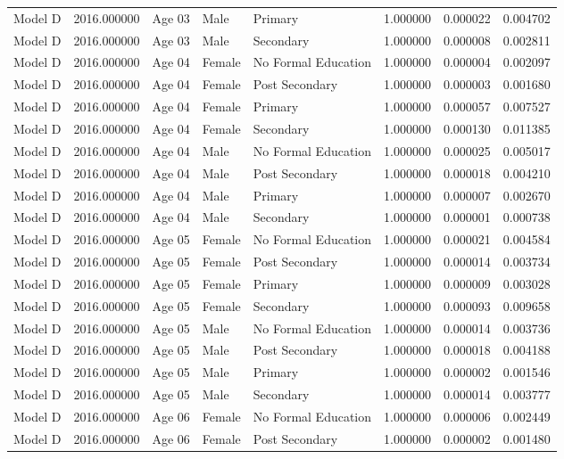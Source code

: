 \begin{table}[ht]
\begin{tabular}{lrlllrrr}
Model D & 2016.000000 & Age 03 & Male & Primary & 1.000000 & 0.000022 & 0.004702 \\
Model D & 2016.000000 & Age 03 & Male & Secondary & 1.000000 & 0.000008 & 0.002811 \\
Model D & 2016.000000 & Age 04 & Female & No Formal Education & 1.000000 & 0.000004 & 0.002097 \\
Model D & 2016.000000 & Age 04 & Female & Post Secondary & 1.000000 & 0.000003 & 0.001680 \\
Model D & 2016.000000 & Age 04 & Female & Primary & 1.000000 & 0.000057 & 0.007527 \\
Model D & 2016.000000 & Age 04 & Female & Secondary & 1.000000 & 0.000130 & 0.011385 \\
Model D & 2016.000000 & Age 04 & Male & No Formal Education & 1.000000 & 0.000025 & 0.005017 \\
Model D & 2016.000000 & Age 04 & Male & Post Secondary & 1.000000 & 0.000018 & 0.004210 \\
Model D & 2016.000000 & Age 04 & Male & Primary & 1.000000 & 0.000007 & 0.002670 \\
Model D & 2016.000000 & Age 04 & Male & Secondary & 1.000000 & 0.000001 & 0.000738 \\
Model D & 2016.000000 & Age 05 & Female & No Formal Education & 1.000000 & 0.000021 & 0.004584 \\
Model D & 2016.000000 & Age 05 & Female & Post Secondary & 1.000000 & 0.000014 & 0.003734 \\
Model D & 2016.000000 & Age 05 & Female & Primary & 1.000000 & 0.000009 & 0.003028 \\
Model D & 2016.000000 & Age 05 & Female & Secondary & 1.000000 & 0.000093 & 0.009658 \\
Model D & 2016.000000 & Age 05 & Male & No Formal Education & 1.000000 & 0.000014 & 0.003736 \\
Model D & 2016.000000 & Age 05 & Male & Post Secondary & 1.000000 & 0.000018 & 0.004188 \\
Model D & 2016.000000 & Age 05 & Male & Primary & 1.000000 & 0.000002 & 0.001546 \\
Model D & 2016.000000 & Age 05 & Male & Secondary & 1.000000 & 0.000014 & 0.003777 \\
Model D & 2016.000000 & Age 06 & Female & No Formal Education & 1.000000 & 0.000006 & 0.002449 \\
Model D & 2016.000000 & Age 06 & Female & Post Secondary & 1.000000 & 0.000002 & 0.001480 \\

\end{tabular}
\end{table}
